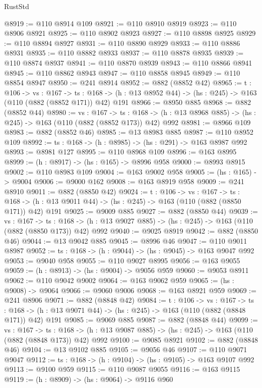 \begin{lexlean}{RustStd}
\begin{coremodule}
@8919 := @110 @8914 @109
@8921 := @110 @8910 @8919
@8923 := @110 @8906 @8921
@8925 := @110 @8902 @8923
@8927 := @110 @8898 @8925
@8929 := @110 @8894 @8927
@8931 := @110 @8890 @8929
@8933 := @110 @8886 @8931
@8935 := @110 @8882 @8933
@8937 := @110 @8878 @8935
@8939 := @110 @8874 @8937
@8941 := @110 @8870 @8939
@8943 := @110 @8866 @8941
@8945 := @110 @8862 @8943
@8947 := @110 @8858 @8945
@8949 := @110 @8854 @8947
@8950 := @241 @8914
@8952 := @882 (@8852 @42)
@8965 := {t : @106} ->
  {vs : @167} ->
  {ts : @168} -> (h : @13 @8952 @44) -> (hs : @245) -> @163 (@110 (@882 (@8852 @171)) @42) @191
@8966 := @8950 @885
@8968 := @882 (@8852 @44)
@8980 := {vs : @167} ->
  {ts : @168} -> (h : @13 @8968 @885) -> (hs : @245) -> @163 (@110 (@882 (@8852 @173)) @42) @992
@8981 := @8966 @109
@8983 := @882 (@8852 @46)
@8985 := @13 @8983 @885
@8987 := @110 @8952 @109
@8992 := {ts : @168} -> (h : @8985) -> (hs : @291) -> @163 @8987 @992
@8993 := @8981 @127
@8995 := @110 @8968 @109
@8996 := @163 @8995
@8999 := (h : @8917) -> (hs : @165) -> @8996 @958
@9000 := @8993 @8915
@9002 := @110 @8983 @109
@9004 := @163 @9002 @958
@9005 := (hs : @165) -> @9004
@9006 := @9000 @162
@9008 := @163 @8919 @958
@9009 := @241 @8910
@9011 := @882 (@8850 @42)
@9024 := {t : @106} ->
  {vs : @167} ->
  {ts : @168} -> (h : @13 @9011 @44) -> (hs : @245) -> @163 (@110 (@882 (@8850 @171)) @42) @191
@9025 := @9009 @885
@9027 := @882 (@8850 @44)
@9039 := {vs : @167} ->
  {ts : @168} -> (h : @13 @9027 @885) -> (hs : @245) -> @163 (@110 (@882 (@8850 @173)) @42) @992
@9040 := @9025 @8919
@9042 := @882 (@8850 @46)
@9044 := @13 @9042 @885
@9045 := @8996 @46
@9047 := @110 @9011 @8987
@9052 := {ts : @168} -> (h : @9044) -> (hs : @9045) -> @163 @9047 @992
@9053 := @9040 @958
@9055 := @110 @9027 @8995
@9056 := @163 @9055
@9059 := (h : @8913) -> (hs : @9004) -> @9056 @959
@9060 := @9053 @8911
@9062 := @110 @9042 @9002
@9064 := @163 @9062 @959
@9065 := (hs : @9008) -> @9064
@9066 := @9060 @9006
@9068 := @163 @8921 @959
@9069 := @241 @8906
@9071 := @882 (@8848 @42)
@9084 := {t : @106} ->
  {vs : @167} ->
  {ts : @168} -> (h : @13 @9071 @44) -> (hs : @245) -> @163 (@110 (@882 (@8848 @171)) @42) @191
@9085 := @9069 @885
@9087 := @882 (@8848 @44)
@9099 := {vs : @167} ->
  {ts : @168} -> (h : @13 @9087 @885) -> (hs : @245) -> @163 (@110 (@882 (@8848 @173)) @42) @992
@9100 := @9085 @8921
@9102 := @882 (@8848 @46)
@9104 := @13 @9102 @885
@9105 := @9056 @46
@9107 := @110 @9071 @9047
@9112 := {ts : @168} -> (h : @9104) -> (hs : @9105) -> @163 @9107 @992
@9113 := @9100 @959
@9115 := @110 @9087 @9055
@9116 := @163 @9115
@9119 := (h : @8909) -> (hs : @9064) -> @9116 @960

\end{coremodule}
\end{lexlean}
